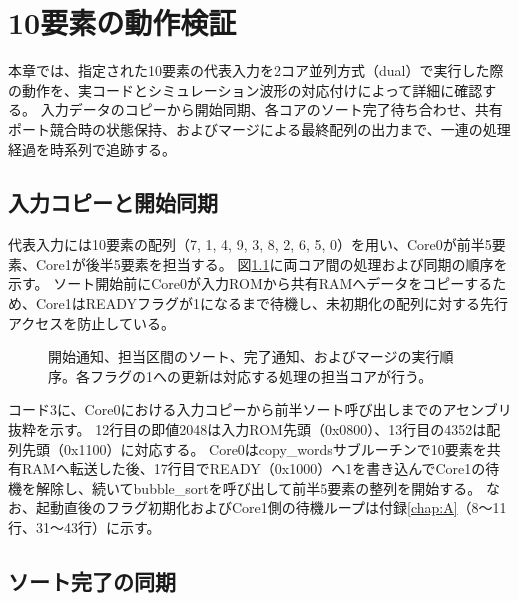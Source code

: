 \chapter{10要素の動作検証}\label{chap:4}

本章では、指定された10要素の代表入力を2コア並列方式（dual）で実行した際の動作を、実コードとシミュレーション波形の対応付けによって詳細に確認する。
入力データのコピーから開始同期、各コアのソート完了待ち合わせ、共有ポート競合時の状態保持、およびマージによる最終配列の出力まで、一連の処理経過を時系列で追跡する。

\section{入力コピーと開始同期}\label{sec:4-1}

代表入力には10要素の配列（7, 1, 4, 9, 3, 8, 2, 6, 5, 0）を用い、Core0が前半5要素、Core1が後半5要素を担当する。
図\ref{fig:2}に両コア間の処理および同期の順序を示す。
ソート開始前にCore0が入力ROMから共有RAMへデータをコピーするため、Core1はREADYフラグが1になるまで待機し、未初期化の配列に対する先行アクセスを防止している。

\begin{figure}[H]
\centering

\caption[分割ソートの実行順序]{開始通知、担当区間のソート、完了通知、およびマージの実行順序。各フラグの1への更新は対応する処理の担当コアが行う。}\label{fig:2}
\end{figure}

コード3に、Core0における入力コピーから前半ソート呼び出しまでのアセンブリ抜粋を示す。
12行目の即値2048は入力ROM先頭（0x0800）、13行目の4352は配列先頭（0x1100）に対応する。
Core0はcopy\_wordsサブルーチンで10要素を共有RAMへ転送した後、17行目でREADY（0x1000）へ1を書き込んでCore1の待機を解除し、続いてbubble\_sortを呼び出して前半5要素の整列を開始する。
なお、起動直後のフラグ初期化およびCore1側の待機ループは付録\ref{chap:A}（8〜11行、31〜43行）に示す。

\par\medskip\noindent\begin{minipage}{\linewidth}
\par\medskip{}\par\nopagebreak

\end{minipage}\par\medskip

\section{ソート完了の同期}\label{sec:4-2}

